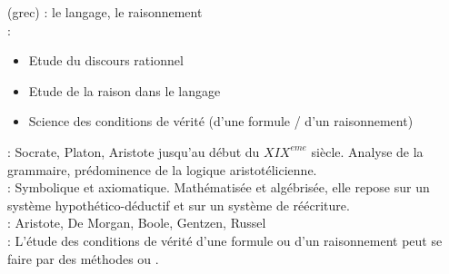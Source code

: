  (grec) : le langage, le raisonnement\\

 : \begin{itemize}
	\item Etude du discours rationnel
	\item Etude de la raison dans le langage
	\item Science des conditions de vérité (d'une formule / d'un raisonnement)
\end{itemize}

 : Socrate, Platon, Aristote jusqu'au début du $XIX^{eme}$ siècle. Analyse de la grammaire, prédominence de la logique aristotélicienne. \\

 : Symbolique et axiomatique. Mathématisée et algébrisée, elle repose sur un système hypothético-déductif et sur un système de réécriture. \\

 : Aristote, De Morgan, Boole, Gentzen, Russel\\

 : L'étude des conditions de vérité d'une formule ou d'un raisonnement peut se faire par des méthodes  ou .
